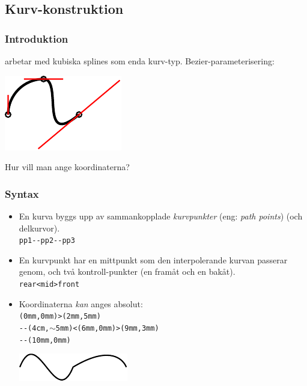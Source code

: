 \documentclass[noamsthm,handout]{beamer}
\newcommand{\inEnglish}[1]{(eng: \emph{#1})}
\begin{document}
\subsection{Kurv-konstruktion}
\begin{frame}\frametitle{Introduktion}
  \Shapes arbetar med kubiska splines som enda kurv-typ.  Bezier-parameterisering:
  \begin{center}
    \includegraphics{figures/spline}
  \end{center}
  Hur vill man ange koordinaterna?
\end{frame}
\begin{frame}\frametitle{Syntax}
  \begin{itemize}
    \item En kurva byggs upp av sammankopplade \emph{kurvpunkter} \inEnglish{path points} (och delkurvor).\\
      \texttt{pp1{\color{red}-{}-}pp2{\color{red}-{}-}pp3}
    \item En kurvpunkt har en mittpunkt som den interpolerande kurvan passerar genom, och två kontroll-punkter (en framåt och en bakåt).\\
      \texttt{rear{\color{red}<}mid{\color{red}>}front}
    \item Koordinaterna \emph{kan} anges absolut:\\
      \texttt{(0mm,0mm)>(2mm,5mm)\\-{}-(4cm,$\sim$5mm)<(6mm,0mm)>(9mm,3mm)\\-{}-(10mm,0mm)}\\
      \begin{center}
        \includegraphics{figures/absolute}        
      \end{center}
  \end{itemize}
\end{frame}
\end{document}
